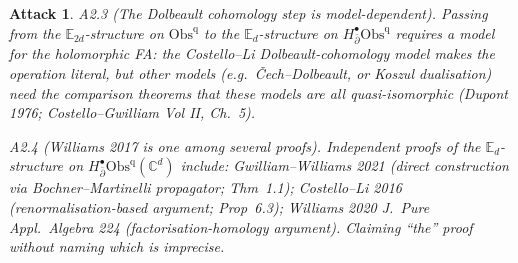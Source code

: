 \documentclass[11pt]{article}
\newtheorem*{attack}{Attack}
\theoremstyle{definition}
\providecommand{\CC}{\mathbb{C}}
\providecommand{\Obs}{\mathrm{Obs}}
\begin{document}
\begin{attack}
\emph{A2.3 (The Dolbeault cohomology step is model-dependent).}
Passing from the $\mathbb{E}_{2d}$-structure on $\Obs^{\mathrm{q}}$ to
the $\mathbb{E}_d$-structure on $H^\bullet_{\bar\partial}\Obs^{\mathrm{q}}$
requires a \emph{model} for the holomorphic FA: the Costello--Li
Dolbeault-cohomology model makes the operation literal, but other
models (e.g.\ \v{C}ech--Dolbeault, or Koszul dualisation) need the
comparison theorems that these models are all quasi-isomorphic
(Dupont 1976; Costello--Gwilliam Vol II, Ch.~5).

\emph{A2.4 (Williams 2017 is one among several proofs).} Independent
proofs of the $\mathbb{E}_d$-structure on
$H^\bullet_{\bar\partial}\Obs^{\mathrm{q}}(\CC^d)$ include:
Gwilliam--Williams 2021 (direct construction via Bochner--Martinelli
propagator; Thm~1.1); Costello--Li 2016 (renormalisation-based argument;
Prop~6.3); Williams 2020 \emph{J.~Pure Appl.~Algebra} 224
(factorisation-homology argument). Claiming ``the'' proof without
naming which is imprecise.
\end{attack}
\end{document}
